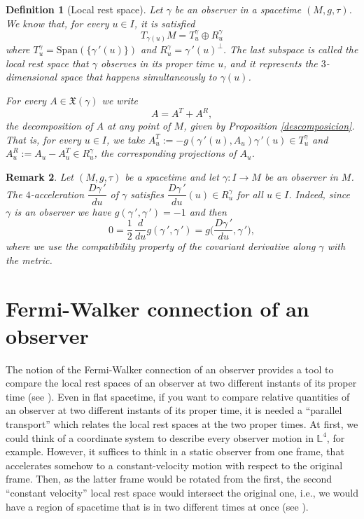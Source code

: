\documentclass[11pt]{book}
\newtheorem{defi}{Definition}[chapter]
\newtheorem{rem}[defi]{Remark}
\def\L{\mathbb L}
\def\x{\mathfrak X}
\begin{document}
\begin{defi}[Local rest space]\label{Local rest space}
	Let $\gamma$ be an observer in a spacetime $(M,g,\tau)$. We know that, for every $u\in I$, it is satisfied 
	\begin{equation}\label{desc esp tang}
		T_{\gamma(u)}M=T_u^\gamma \oplus R_u^\gamma
	\end{equation}
	where $T_u^\gamma=\text{Span}(\{\gamma{\,'}(u)\})$ and $R_u^\gamma=\gamma{\,'}(u)^{\perp}$. The last subspace is called the local rest space that $\gamma$ observes in its proper time $u$, and it represents the $3$-dimensional space that happens simultaneously to $\gamma(u)$.
	
	For every $A\in \x(\gamma)$ we write
	$$A=A^T + A^R,$$ the decomposition of $A$ at any point of $M$, given by Proposition \ref{descomposicion}. That is, for every $u\in I$, we take $A_u^T:=-g(\gamma{\,'}(u),A_u)\gamma{\,'}(u)\in T_u^\gamma$ and $A_u^R:=A_u-A_u^T\in R_u^\gamma$, the corresponding projections of $A_u$. 
\end{defi}

\begin{rem}\label{deriv ortogonal}
	{\rm Let $(M,g,\tau)$ be a spacetime and let $\gamma:I\to M$ be an observer in $M$. The $4$-acceleration $\dfrac{D\gamma{\,'}}{du}$ of $\gamma$ satisfies $\dfrac{D\gamma{\,'}}{du}(u)\in R_u^\gamma $ for all $u\in I$. Indeed, since $\gamma$ is an observer we have $g(\gamma{\,'},\gamma{\,'})=-1$ and then
	\[
	0=\frac{1}{2}\,\frac{d}{du}g(\gamma{\,'},\gamma{\,'})=g\Big(\frac{D\gamma{\,'}}{du},\gamma{\,'}\Big),
	\]	
	where we use the compatibility property of the covariant derivative along $\gamma$ with the metric.
	}
\end{rem}

\section{Fermi-Walker connection of an observer}
The notion of the Fermi-Walker connection of an observer provides a tool to compare the local rest spaces of an observer at two different instants of its proper time (see \cite{GL}). Even in flat spacetime, if you want to compare relative quantities of an observer at two different instants of its proper time, it is needed a ``parallel transport'' which relates the local rest spaces at the two proper times. At first, we could think of a coordinate system to describe every observer motion in $\L^4$, for example. However, it suffices to think in a static observer from one frame, that accelerates somehow to a constant-velocity motion with respect to the original frame. Then, as the latter frame would be rotated from the first, the second ``constant velocity'' local rest space would intersect the original one, i.e., we would have a region of spacetime that is in two different times at once (see \cite[Chapter 6]{Gravitation}).
\end{document}
